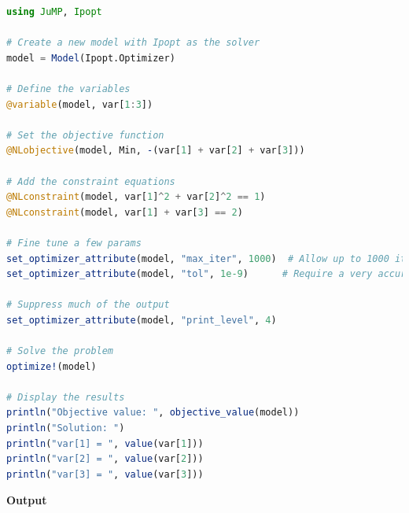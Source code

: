 \begin{lstlisting}[language=Julia,style=mystyle]
using JuMP, Ipopt

# Create a new model with Ipopt as the solver
model = Model(Ipopt.Optimizer)

# Define the variables
@variable(model, var[1:3])

# Set the objective function
@NLobjective(model, Min, -(var[1] + var[2] + var[3]))

# Add the constraint equations
@NLconstraint(model, var[1]^2 + var[2]^2 == 1)
@NLconstraint(model, var[1] + var[3] == 2)

# Fine tune a few params
set_optimizer_attribute(model, "max_iter", 1000)  # Allow up to 1000 iterations
set_optimizer_attribute(model, "tol", 1e-9)      # Require a very accurate solution

# Suppress much of the output
set_optimizer_attribute(model, "print_level", 4)

# Solve the problem
optimize!(model)

# Display the results
println("Objective value: ", objective_value(model))
println("Solution: ")
println("var[1] = ", value(var[1]))
println("var[2] = ", value(var[2]))
println("var[3] = ", value(var[3]))

\end{lstlisting}
\textbf{Output} 
